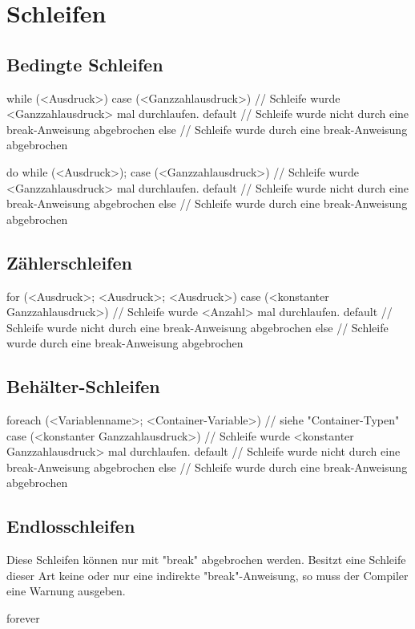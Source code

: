 \chapter{Schleifen}
\section{Bedingte Schleifen}
while (<Ausdruck>)
{
}
case (<Ganzzahlausdruck>) // Schleife wurde <Ganzzahlausdruck> mal durchlaufen.
{
}
default // Schleife wurde nicht durch eine break-Anweisung abgebrochen
{
}
else // Schleife wurde durch eine break-Anweisung abgebrochen
{
}

do
{
}
while (<Ausdruck>);
case (<Ganzzahlausdruck>) // Schleife wurde <Ganzzahlausdruck> mal durchlaufen.
{
}
default // Schleife wurde nicht durch eine break-Anweisung abgebrochen
{
}
else // Schleife wurde durch eine break-Anweisung abgebrochen
{
}

\section{Zählerschleifen}
for (<Ausdruck>; <Ausdruck>; <Ausdruck>)
{
}
case (<konstanter Ganzzahlausdruck>) // Schleife wurde <Anzahl> mal durchlaufen.
{
}
default // Schleife wurde nicht durch eine break-Anweisung abgebrochen
{
}
else // Schleife wurde durch eine break-Anweisung abgebrochen
{
}

\section{Behälter-Schleifen}
foreach (<Variablenname>; <Container-Variable>) // siehe "Container-Typen"
{
}
case (<konstanter Ganzzahlausdruck>) // Schleife wurde <konstanter Ganzzahlausdruck> mal durchlaufen.
{
}
default // Schleife wurde nicht durch eine break-Anweisung abgebrochen
{
}
else // Schleife wurde durch eine break-Anweisung abgebrochen
{
}

\section{Endlosschleifen}
Diese Schleifen können nur mit "break" abgebrochen werden. Besitzt eine Schleife dieser Art keine oder nur eine indirekte "break"-Anweisung, so muss
der Compiler eine Warnung ausgeben.

forever
{
}